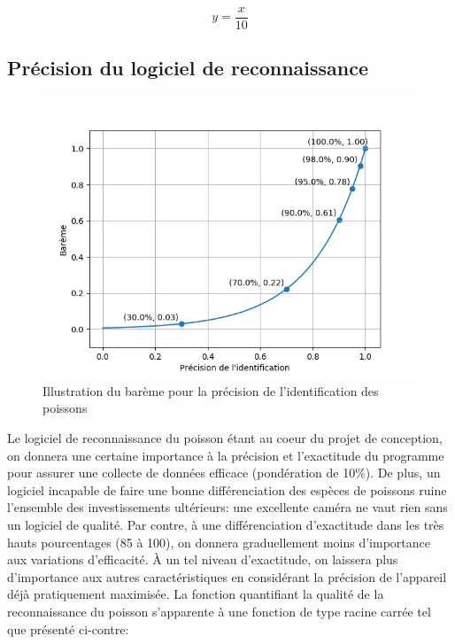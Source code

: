\begin{equation}
    y = \frac{x}{10}
    \label{eq:bareme_duree_de_vie}
\end{equation}

\subsection{Précision du logiciel de reconnaissance}

\begin{figure}
    \centering
    \includegraphics[width=\linewidth]{fig/bareme_ident.png}
    \caption{Illustration du barème pour la précision de l'identification des poissons}
    \label{fig:bareme_precision}
\end{figure}

Le logiciel de reconnaissance du poisson étant au coeur du projet de conception, on donnera une certaine importance à la précision et l'exactitude du programme pour assurer une collecte de données efficace (pondération de 10\%). De plus, un logiciel incapable de faire une bonne différenciation des espèces de poissons ruine l'ensemble des investissements ultérieurs: une excellente caméra ne vaut rien sans un logiciel de qualité. Par contre, à une différenciation d'exactitude dans les très hauts pourcentages (85 à 100), on donnera graduellement moins d'importance aux variations d'efficacité. À un tel niveau d'exactitude, on laissera plus d'importance aux autres caractéristiques en considérant la précision de l'appareil déjà pratiquement maximisée. La fonction quantifiant la qualité de la reconnaissance du poisson s'apparente à une fonction de type racine carrée tel que présenté ci-contre:

